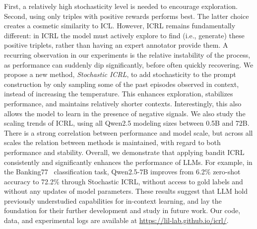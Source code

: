 \documentclass{article}
\theoremstyle{plain}
\theoremstyle{definition}
\theoremstyle{remark}
\newcommand{\qwen}{Qwen\xspace}
\newcommand{\banking}{Banking77\xspace}
\newcommand{\explorative}{Stochastic ICRL\xspace}
\begin{document}
First, a relatively high stochasticity level is needed to encourage exploration. Second, using only triples with positive rewards performs best.
The latter choice creates a cosmetic similarity to ICL. However, ICRL remains fundamentally different: in ICRL the model must actively explore to find (i.e., generate) these positive triplets, rather than having an expert annotator provide them.
A recurring observation in our experiments is the relative instability of the process, as performance can suddenly dip significantly, before often quickly recovering.
We propose a new method, \textit{\explorative}, to add stochasticity to the prompt construction by only sampling some of the past episodes observed in context, instead of increasing the temperature.
This enhances exploration, stabilizes performance, and maintains relatively shorter contexts.
Interestingly, this also allows the model to learn in the presence of negative signals.
We also study the scaling trends of ICRL, using all \qwen{2.5} modeling sizes between 0.5B and 72B.
There is a strong correlation between performance and model scale, but across all scales the relation between methods is maintained, with regard to both performance and stability.
Overall, we demonstrate that applying bandit ICRL consistently and significantly enhances the performance of LLMs.
For example, in the \banking~\citep{Casanueva2020} classification task, \qwen{2.5}-7B improves from 6.2\% zero-shot accuracy to 72.2\% through \explorative, without access to gold labels and without any updates of model parameters.
These results suggest that LLM hold previously understudied  capabilities for in-context learning, and lay the foundation for their further development and study in future work.
Our code, data, and experimental logs are available at \url{https://lil-lab.github.io/icrl/}.
\end{document}
